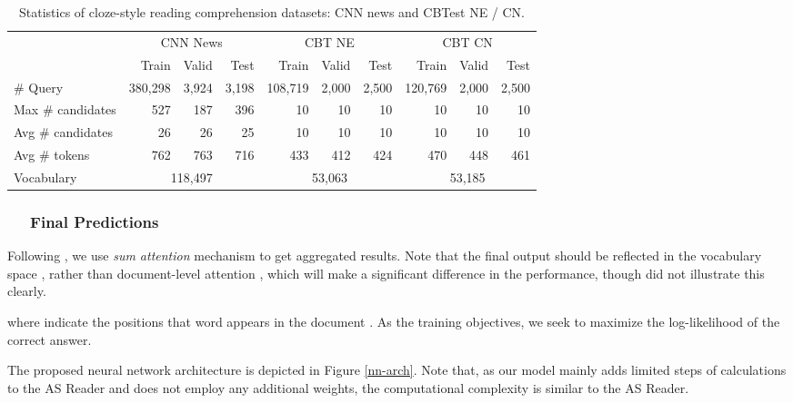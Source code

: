 \documentclass[11pt,a4paper]{article}
\begin{document}
        \begin{table*}[htbp]
        \begin{center}
        \begin{tabular}{lrrrrrrrrr}
        \toprule
        & \multicolumn{3}{c}{CNN News} & \multicolumn{3}{c}{CBT NE} & \multicolumn{3}{c}{CBT CN} \\
        & Train & Valid & Test & Train & Valid & Test & Train & Valid & Test \\
        \midrule
        \# Query & 380,298 & 3,924 & 3,198 & 108,719 & 2,000 & 2,500 & 120,769 & 2,000 & 2,500 \\
        Max \# candidates & 527 & 187 & 396 & 10 & 10 & 10 & 10 & 10 & 10 \\
        Avg \# candidates & 26 & 26 & 25 & 10 & 10 & 10 & 10 & 10 & 10 \\
        Avg \# tokens & 762 & 763 & 716 & 433 & 412 & 424 & 470 & 448 & 461 \\
        Vocabulary & \multicolumn{3}{c}{118,497} & \multicolumn{3}{c}{53,063} & \multicolumn{3}{c}{53,185}\\
        \bottomrule
        \end{tabular}
        \end{center}
        \caption{\label{cbt-stats} Statistics of cloze-style reading comprehension datasets: CNN news and CBTest NE / CN.}
        \end{table*}

\subsubsection*{~~ Final Predictions}
Following , we use {\em sum attention} mechanism to get aggregated results. Note that the final output should be reflected in the vocabulary space , rather than document-level attention , which will make a significant difference in the performance, though  did not illustrate this clearly. 


where  indicate the positions that word  appears in the document . 
As the training objectives, we seek to maximize the log-likelihood of the correct answer.


The proposed neural network architecture is depicted in Figure \ref{nn-arch}.
Note that, as our model mainly adds limited steps of calculations to the AS Reader \cite{kadlec-etal-2016} and does not employ any additional weights, the computational complexity is similar to the AS Reader. 
\end{document}
